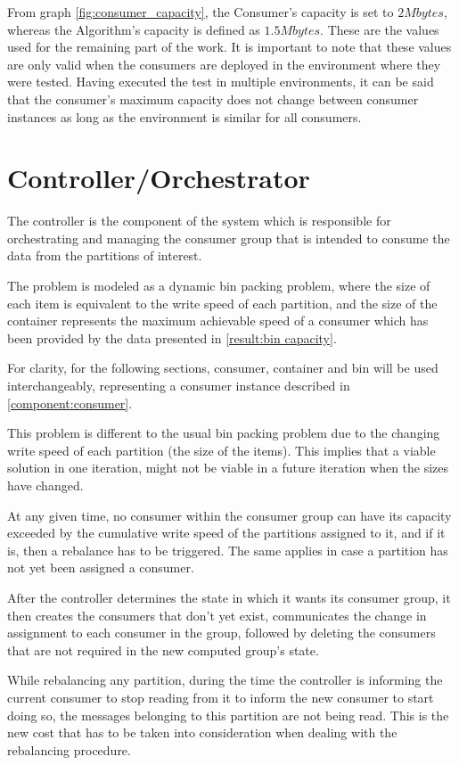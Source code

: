 From graph \ref{fig:consumer_capacity}, the Consumer's capacity is set to $2
Mbytes$, whereas the Algorithm's capacity is defined as $1.5 Mbytes$.  These are
the values used for the remaining part of the work.  It is important to note
that these values are only valid when the consumers are deployed in the
environment where they were tested. Having executed the test in multiple
environments, it can be said that the consumer's maximum capacity does not
change between consumer instances as long as the environment is similar for all
consumers.

\section{Controller/Orchestrator} \label{component:controller}

The controller is the component of the system which is responsible for
orchestrating and managing the consumer group that is intended to consume the
data from the partitions of interest. 

The problem is modeled as a dynamic bin packing problem, where the size of each
item is equivalent to the write speed of each partition, and the size of the
container represents the maximum achievable speed of a consumer which has been
provided by the data presented in \ref{result:bin capacity}.

For clarity, for the following sections, consumer, container and bin will be
used interchangeably, representing a consumer instance described in
\ref{component:consumer}.

This problem is different to the usual bin packing problem due to the changing
write speed of each partition (the size of the items). This implies that a
viable solution in one iteration, might not be viable in a future iteration when
the sizes have changed.

At any given time, no consumer within the consumer group can have its capacity
exceeded by the cumulative write speed of the partitions assigned to it, and if
it is, then a rebalance has to be triggered. The same applies in case a
partition has not yet been assigned a consumer.

After the controller determines the state in which it wants its consumer group,
it then creates the consumers that don't yet exist, communicates the change in
assignment to each consumer in the group, followed by deleting the consumers
that are not required in the new computed group's state.

While rebalancing any partition, during the time the controller is informing the
current consumer to stop reading from it to inform the new consumer to start
doing so, the messages belonging to this partition are not being read. This is
the new cost that has to be taken into consideration when dealing with the
rebalancing procedure.

